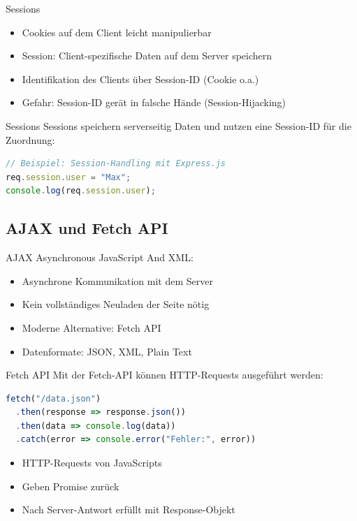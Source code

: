 \begin{definition}{Sessions}
\begin{itemize}
\item Cookies auf dem Client leicht manipulierbar
\item Session: Client-spezifische Daten auf dem Server speichern
\item Identifikation des Clients über Session-ID (Cookie o.a.)
\item Gefahr: Session-ID gerät in falsche Hände (Session-Hijacking)
\end{itemize}
\end{definition}



\begin{definition}{Sessions}
Sessions speichern serverseitig Daten und nutzen eine Session-ID für die Zuordnung:
\begin{lstlisting}[language=JavaScript, style=basesmol]
// Beispiel: Session-Handling mit Express.js
req.session.user = "Max";
console.log(req.session.user);
\end{lstlisting}
\end{definition}

\pagebreak

\subsection{AJAX und Fetch API}

\begin{concept}{AJAX}
    Asynchronous JavaScript And XML:
    \begin{itemize}
        \item Asynchrone Kommunikation mit dem Server
        \item Kein vollständiges Neuladen der Seite nötig
        \item Moderne Alternative: Fetch API
        \item Datenformate: JSON, XML, Plain Text
    \end{itemize}
\end{concept}

\begin{definition}{Fetch API}
Mit der Fetch-API können HTTP-Requests ausgeführt werden:
\begin{lstlisting}[language=JavaScript, style=basesmol]
fetch("/data.json")
  .then(response => response.json())
  .then(data => console.log(data))
  .catch(error => console.error("Fehler:", error))
\end{lstlisting}
\begin{itemize}
\item HTTP-Requests von JavaScripts
\item Geben Promise zurück
\item Nach Server-Antwort erfüllt mit Response-Objekt
\end{itemize}
\end{definition}


